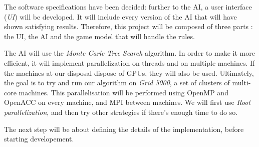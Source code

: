 The software specifications have been decided: further to the AI, a user interface (\emph{UI}) will be developed.
It will include every version of the AI that will have shown satisfying results.
Therefore, this project will be composed of three parts : the UI, the AI and the game model that will handle the rules.

The AI will use the \emph{Monte Carle Tree Search} algorithm.
In order to make it more efficient, it will implement parallelization on threads and on multiple machines.
If the machines at our disposal dispose of GPUs, they will also be used.
Ultimately, the goal is to try and run our algorithm on \emph{Grid 5000}, a set of clusters of multi-core machines.
This parallelisation will be performed using OpenMP and OpenACC on every machine, and MPI between machines.
We will first use \emph{Root parallelization}, and then try other strategies if there's enough time to do so.

The next step will be about defining the details of the implementation, before starting developement.